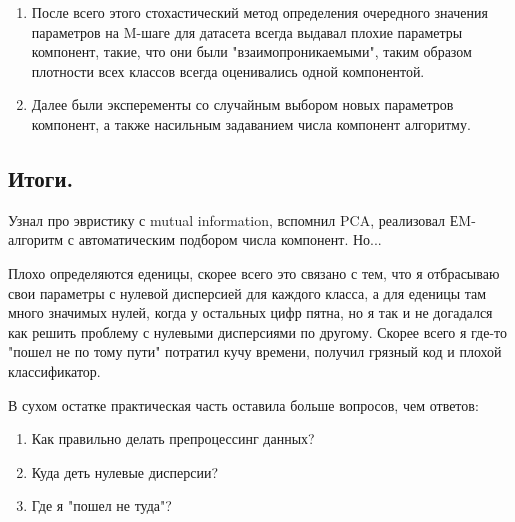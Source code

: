 \documentclass[12pt]{article}
\begin{document}
\begin{enumerate}
    \item После всего этого стохастический метод определения очередного значения
          параметров на M-шаге для датасета всегда выдавал плохие параметры
          компонент, такие, что они были "взаимопроникаемыми", таким образом
          плотности всех классов всегда оценивались одной компонентой.

    \item Далее были эксперементы со случайным выбором новых параметров компонент,
          а также насильным задаванием числа компонент алгоритму.
\end{enumerate}


\subsection{Итоги.}
Узнал про эвристику с mutual information, вспомнил PCA, реализовал ЕM-алгоритм
с автоматическим подбором числа компонент. Но...

Плохо определяются еденицы, скорее всего это связано с тем, что я
отбрасываю свои параметры с нулевой дисперсией для каждого класса, а
для еденицы там много значимых нулей, когда у остальных цифр пятна, но
я так и не догадался как решить проблему с нулевыми дисперсиями по другому.
Скорее всего я где-то "пошел не по тому пути" потратил кучу времени,
получил грязный код и плохой классификатор.

В сухом остатке практическая часть оставила больше вопросов, чем ответов:
\begin{enumerate}
\item Как правильно делать препроцессинг данных?
\item Куда деть нулевые дисперсии?
\item Где я "пошел не туда"?
\end{enumerate}
\end{document}
